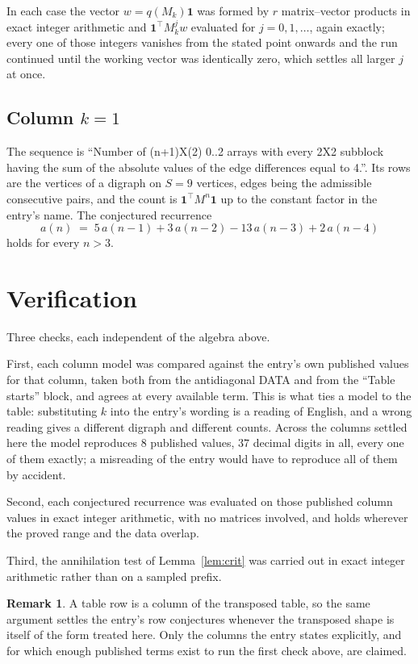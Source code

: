 \documentclass[11pt,a4paper]{article}
\theoremstyle{plain}
\theoremstyle{definition}
\newtheorem{remark}[theorem]{Remark}
\begin{document}
In each case the vector $w=q(M_k)\mathbf{1}$ was formed by $r$ matrix--vector products in
exact integer arithmetic and $\mathbf{1}^{\!\top}M_k^{j}w$ evaluated for $j=0,1,\dots$,
again exactly; every one of those integers vanishes from the stated point onwards and the run
continued until the working vector was identically zero, which settles all larger $j$ at once.

\subsection*{Column $k=1$}
The sequence is ``Number of (n+1)X(2) 0..2 arrays with every 2X2 subblock having the sum of the absolute values of the edge differences equal to 4.''. Its rows are the vertices of a digraph on
$S=9$ vertices, edges being the admissible consecutive pairs, and the count is
$\mathbf{1}^{\!\top}M^{n}\mathbf{1}$ up to the constant factor in the entry's name.
The conjectured recurrence
\[
a(n)\;=\;5\,a(n-1) + 3\,a(n-2) - 13\,a(n-3) + 2\,a(n-4)
\]
holds for every $n>3$.

\section{Verification}

Three checks, each independent of the algebra above.

First, each column model was compared against the entry's own published values for that
column, taken both from the antidiagonal DATA and from the ``Table starts'' block, and agrees
at every available term. This is what ties a model to the table: substituting $k$ into the
entry's wording is a reading of English, and a wrong reading gives a different digraph and
different counts. Across the columns settled here the model reproduces $8$ published
values, $37$ decimal digits in all, every one of them exactly; a misreading of the entry
would have to reproduce all of them by accident.

Second, each conjectured recurrence was evaluated on those published column values in exact
integer arithmetic, with no matrices involved, and holds wherever the proved range and the
data overlap.

Third, the annihilation test of Lemma~\ref{lem:crit} was carried out in exact integer
arithmetic rather than on a sampled prefix.

\begin{remark}
A table row is a column of the transposed table, so the same argument settles the entry's row
conjectures whenever the transposed shape is itself of the form treated here. Only the columns
the entry states explicitly, and for which enough published terms exist to run the first check
above, are claimed.
\end{remark}
\end{document}
